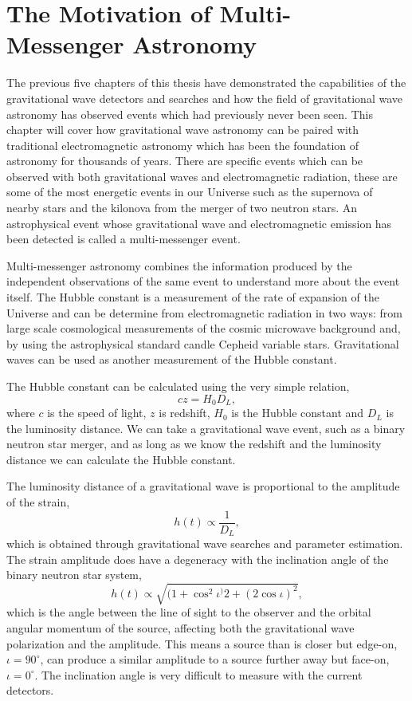 \section{The Motivation of Multi-Messenger Astronomy}

The previous five chapters of this thesis have demonstrated the capabilities of the gravitational wave detectors and searches and how the field of gravitational wave astronomy has observed events which had previously never been seen. This chapter will cover how gravitational wave astronomy can be paired with traditional electromagnetic astronomy which has been the foundation of astronomy for thousands of years. There are specific events which can be observed with both gravitational waves and electromagnetic radiation, these are some of the most energetic events in our Universe such as the supernova of nearby stars and the kilonova from the merger of two neutron stars. An astrophysical event whose gravitational wave and electromagnetic emission has been detected is called a multi-messenger event.

Multi-messenger astronomy combines the information produced by the independent observations of the same event to understand more about the event itself. The Hubble constant is a measurement of the rate of expansion of the Universe and can be determine from electromagnetic radiation in two ways: from large scale cosmological measurements of the cosmic microwave background and, by using the astrophysical standard candle Cepheid variable stars. Gravitational waves can be used as another measurement of the Hubble constant.

The Hubble constant can be calculated using the very simple relation,
%
\begin{equation}
    cz = H_{0} D_{L}, 
\end{equation}
%
where $c$ is the speed of light, $z$ is redshift, $H_{0}$ is the Hubble constant and $D_{L}$ is the luminosity distance. We can take a gravitational wave event, such as a binary neutron star merger, and as long as we know the redshift and the luminosity distance we can calculate the Hubble constant.

The luminosity distance of a gravitational wave is proportional to the amplitude of the strain,
%
\begin{equation}
    h(t) \propto \frac{1}{D_{L}} , 
\end{equation}
%
which is obtained through gravitational wave searches and parameter estimation. The strain amplitude does have a degeneracy with the inclination angle of the binary neutron star system,
%
\begin{equation}
    h(t) \propto \sqrt{(1+\cos^{2}\iota^){2} + (2\cos\iota)^{2}},
\end{equation}
%
which is the angle between the line of sight to the observer and the orbital angular momentum of the source, affecting both the gravitational wave polarization and the amplitude. This means a source than is closer but edge-on, $\iota = 90^{\circ}$, can produce a similar amplitude to a source further away but face-on, $\iota = 0^{\circ}$. The inclination angle is very difficult to measure with the current detectors.

